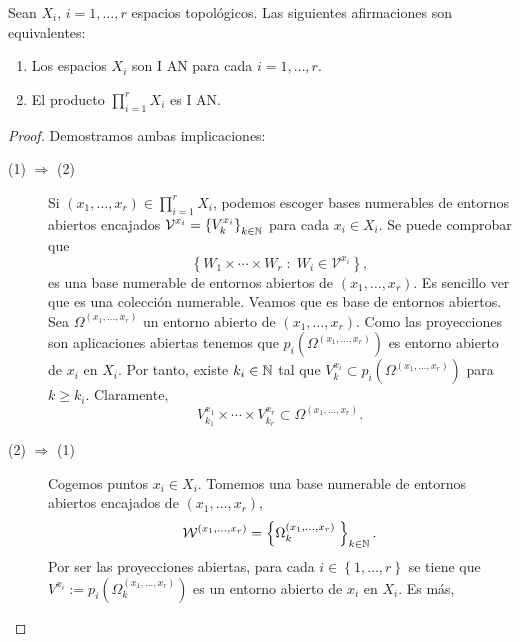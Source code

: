 \begin{prop}
Sean $\displaystyle X_{i} $, $\displaystyle i = 1, \ldots, r $ espacios topológicos. Las siguientes afirmaciones son equivalentes:
\begin{enumerate}
\item Los espacios $\displaystyle X_{i} $ son I AN para cada $\displaystyle i = 1, \ldots, r $. 
\item El producto $\displaystyle \prod^{r}_{i = 1}X_{i} $ es I AN. 
\end{enumerate}	
\end{prop}
\begin{proof}
Demostramos ambas implicaciones:
\begin{description}
	\item[(1) $\displaystyle \Rightarrow $ (2)] Si $\displaystyle \left(x_{1}, \ldots, x_{r}\right)\in \prod^{r}_{ i= 1}X_{i} $, podemos escoger bases numerables de entornos abiertos encajados $\displaystyle \mathcal{V}^{x_{i}}= \left\{ V_{k}^{x_{i}}\right\} _{k \in \mathbb{N}} $ para cada $\displaystyle x_{i} \in X_{i} $. Se puede comprobar que 
		\[ \left\{ W_{1} \times \cdots \times W_{r} \; : \; W_{i} \in \mathcal{V}^{x_{i}}\right\}  ,\]
		es una base numerable de entornos abiertos de $\displaystyle \left(x_{1}, \ldots, x_{r}\right) $. Es sencillo ver que es una colección numerable. Veamos que es base de entornos abiertos. Sea $\displaystyle \Omega^{\left(x_{1}, \ldots, x_{r}\right)} $ un entorno abierto de $\displaystyle \left(x_{1}, \ldots, x_{r}\right) $. Como las proyecciones son aplicaciones abiertas tenemos que $\displaystyle p_{i}\left(\Omega^{\left(x_{1}, \ldots, x_{r}\right)}\right) $ es entorno abierto de $\displaystyle x_{i} $ en $\displaystyle X_{i} $.
		Por tanto, existe $\displaystyle k_{i} \in \mathbb{N} $ tal que $\displaystyle V^{x_{i}}_{k}\subset p_{i}\left(\Omega^{\left(x_{1}, \ldots, x_{r}\right)}\right) $ para $\displaystyle k \geq k_{i} $. Claramente, 
		\[V^{x_{1}}_{k_{1}} \times \cdots \times V^{x_{r}}_{k_{r}}\subset \Omega^{\left(x_{1}, \ldots, x_{r}\right)} .\]
	\item[(2) $\displaystyle \Rightarrow $ (1)] Cogemos puntos $\displaystyle x_{i} \in X_{i} $. Tomemos una base numerable de entornos abiertos encajados de $\displaystyle \left(x_{1}, \ldots, x_{r}\right) $,
		\[\mathcal{W}^{\left(x_{1}, \ldots, x_{r}\right)} = \left\{ \Omega_{k}^{\left(x_{1}, \ldots, x_{r}\right)} \; \right\} _{k \in \mathbb{N}} .\]
		Por ser las proyecciones abiertas, para cada $\displaystyle i \in \left\{ 1, \ldots, r\right\}  $ se tiene que $\displaystyle V^{x_{i}}:=p_{i}\left(\Omega_{k}^{\left(x_{1}, \ldots, x_{r}\right)}\right) $ es un entorno abierto de $\displaystyle x_{i} $ en $\displaystyle X_{i} $. Es más, 

\end{description}
\end{proof}
